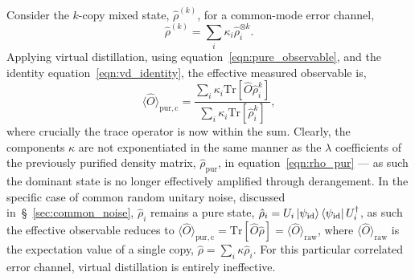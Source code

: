 Consider the $k$-copy mixed state, $\hat\rho^{(k)}$, for a common-mode error channel,
\begin{equation}
    \hat\rho^{(k)} = \sum_{i}\kappa_i \hat\rho_i^{\otimes k}.
\end{equation}
Applying virtual distillation, using equation~\ref{eqn:pure_observable}, and the identity equation~\ref{eqn:vd_identity}, the effective measured observable is,
\begin{equation}
    \langle\hat{O}\rangle_\mathrm{pur,c}=\frac{\sum_{i}\kappa_i\mathrm{Tr}[\hat{O}\hat\rho_i^k]}{\sum_i\kappa_i\mathrm{Tr}[\hat\rho_i^k]},
\end{equation}
where crucially the trace operator is now within the sum.
Clearly, the components $\kappa$ are not exponentiated in the same manner as the $\lambda$ coefficients of the previously purified density matrix, $\hat\rho_\mathrm{pur}$, in equation~\ref{eqn:rho_pur} --- as such the dominant state is no longer effectively amplified through derangement. In the specific case of common random unitary noise, discussed in~\S~\ref{sec:common_noise}, $\hat\rho_i$ remains a pure state, $\hat\rho_i = U_i\ket{\psi_\mathrm{id}}\bra{\psi_\mathrm{id}}U_i^\dagger$, as such the effective observable reduces to $\langle\hat O\rangle_\mathrm{pur,c}= \mathrm{Tr}[\hat O \hat\rho] = \langle\hat O\rangle_\mathrm{raw}$, where $\langle\hat O\rangle_\mathrm{raw}$ is the expectation value of a single copy, $\hat\rho=\sum_i\kappa\hat\rho_i$. For this particular correlated error channel, virtual distillation is entirely ineffective.

